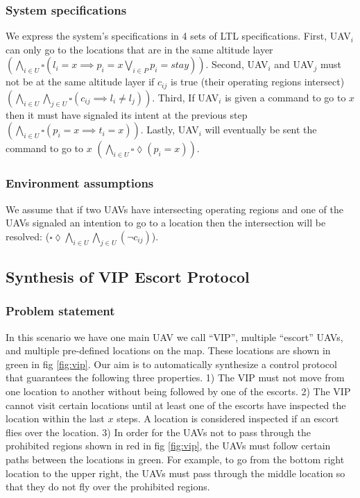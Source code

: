 \documentclass[]{article}
\begin{document}
\subsubsection{System specifications}\label{system-specifications}

We express the system's specifications in 4 sets of LTL specifications. First, UAV$_{i}$ can only go to the locations that are in the same altitude layer $(\bigwedge\limits_{i \in U} \square (l_{i} = x \implies p_{i} = x \bigvee\limits_{i \in P} p_{i} = stay))$. Second, UAV$_{i}$ and UAV$_{j}$ must not be at the same altitude layer if
  $c_{ij}$ is true (their operating regions intersect) $(\bigwedge\limits_{i\in U} \bigwedge\limits_{j\in U} \square (c_{ij} \implies l_{i} \neq l_{j}))$. Third, If UAV$_{i}$ is given a command to go to $x$ then it must have signaled its intent at the 
  previous step $(\bigwedge\limits_{i \in U} \square (p_{i} = x \implies t_{i} = x))$. Lastly, UAV$_{i}$ will eventually be sent the command to go to $x$ $(\bigwedge\limits_{i \in U} \square \lozenge (p_{i} = x))$.

\subsubsection{Environment assumptions}\label{environment-assumptions}


We assume that if two UAVs have intersecting operating regions and one
of the UAVs signaled an intention to go to a location then the
intersection will be resolved: ($\square  \lozenge \bigwedge\limits_{i \in U}\bigwedge\limits_{j \in U} ( \lnot c_{ij})$).


\subsection{Synthesis of VIP Escort Protocol}\label{vip-escort}

\subsubsection{Problem statement}\label{problem-statement}

In this scenario we have one main UAV we call ``VIP'', multiple
``escort'' UAVs, and multiple pre-defined locations on the map. These locations are shown in green in fig \ref{fig:vip}. Our aim is
to automatically synthesize a control protocol that guarantees the following three properties. 1) The VIP must not move from one location to another without being
  followed by one of the escorts. 2) The VIP cannot visit certain locations until at least one of the escorts have inspected the location within the last $x$ steps. A location is considered inspected if an escort flies over the location. 3) In order for 
  the UAVs not to pass through the prohibited regions shown in red in fig 
  \ref{fig:vip}, the UAVs must follow certain paths between the locations in green. 
  For example, to go from the bottom right location to the upper right, the UAVs 
  must pass through the middle location so that they do not fly over the prohibited 
  regions.
\end{document}

